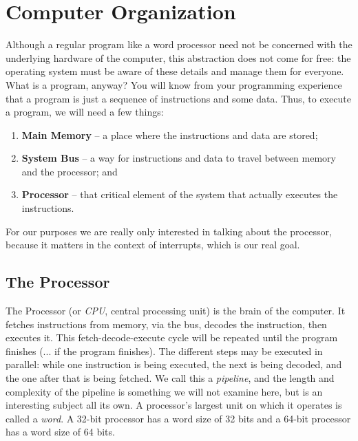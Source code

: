 




\section*{Computer Organization}
Although a regular program like a word processor need not be concerned with the underlying hardware of the computer, this abstraction does not come for free: the operating system must be aware of these details and manage them for everyone. What is a program, anyway? You will know from your programming experience that a program is just a sequence of instructions and some data. Thus, to execute a program, we will need a few things:

\begin{enumerate}
	\item \textbf{Main Memory} -- a place where the instructions and data are stored;
	\item \textbf{System Bus} -- a way for instructions and data to travel between memory and the processor; and
	\item \textbf{Processor} -- that critical element of the system that actually executes the instructions.
\end{enumerate}

For our purposes we are really only interested in talking about the processor, because it matters in the context of interrupts, which is our real goal. 

\subsection*{The Processor}

The Processor (or \textit{CPU}, central processing unit) is the brain of the computer. It fetches instructions from memory, via the bus, decodes the instruction, then executes it. This fetch-decode-execute cycle will be repeated until the program finishes (... if the program finishes). The different steps may be executed in parallel: while one instruction is being executed, the next is being decoded, and the one after that is being fetched. We call this a \textit{pipeline}, and the length and complexity of the pipeline is something we will not examine here, but is an interesting subject all its own. A processor's largest unit on which it operates is called a \textit{word}. A 32-bit processor has a word size of 32 bits and a 64-bit processor has a word size of 64 bits.

